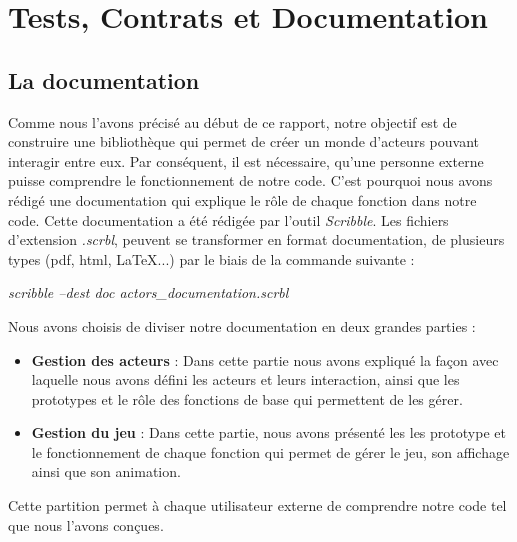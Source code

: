 \documentclass[a4paper,10pt]{article}
\begin{document}
\section{Tests, Contrats et Documentation}
\label{doc}
\subsection{La documentation}
Comme nous l'avons précisé au début de ce rapport, notre objectif est de construire une bibliothèque qui permet de créer un monde d'acteurs pouvant interagir entre eux. Par conséquent, il est nécessaire, qu'une personne externe puisse comprendre le fonctionnement de notre code. C'est pourquoi nous avons rédigé une documentation qui explique le rôle de chaque fonction dans notre code. Cette documentation a été rédigée par l'outil \textit{Scribble}. Les fichiers d'extension \textit{.scrbl}, peuvent se transformer en format documentation, de plusieurs types (pdf, html, \LaTeX ...) par le biais de la commande suivante : \\
\begin{center}
    \textit{scribble --dest doc actors\_documentation.scrbl} \\
\end{center}
Nous avons choisis de diviser notre documentation en deux grandes parties : \\
\begin{itemize}
    \item \textbf{Gestion des acteurs} : Dans cette partie nous avons expliqué la façon avec laquelle nous avons défini les acteurs et leurs interaction, ainsi que les prototypes et le rôle des fonctions de base qui permettent de les gérer. \\
    \item \textbf{Gestion du jeu} : Dans cette partie, nous avons présenté les les prototype et le fonctionnement de chaque fonction qui permet de gérer le jeu, son affichage ainsi que son animation. \\
\end{itemize}

Cette partition permet à chaque utilisateur externe de comprendre notre code tel que nous l'avons conçues.
\end{document}
